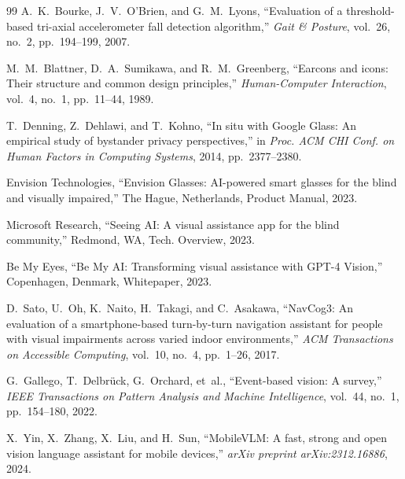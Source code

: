 \documentclass[10pt,twocolumn]{article}
\begin{document}
\begin{thebibliography}{99}
A.~K.~Bourke, J.~V.~O'Brien, and G.~M.~Lyons, ``Evaluation of a threshold-based tri-axial accelerometer fall detection algorithm,'' \emph{Gait \& Posture}, vol.~26, no.~2, pp.~194--199, 2007.

M.~M.~Blattner, D.~A.~Sumikawa, and R.~M.~Greenberg, ``Earcons and icons: Their structure and common design principles,'' \emph{Human-Computer Interaction}, vol.~4, no.~1, pp.~11--44, 1989.

T.~Denning, Z.~Dehlawi, and T.~Kohno, ``In situ with Google Glass: An empirical study of bystander privacy perspectives,'' in \emph{Proc. ACM CHI Conf. on Human Factors in Computing Systems}, 2014, pp.~2377--2380.

Envision Technologies, ``Envision Glasses: AI-powered smart glasses for the blind and visually impaired,'' The Hague, Netherlands, Product Manual, 2023.

Microsoft Research, ``Seeing AI: A visual assistance app for the blind community,'' Redmond, WA, Tech. Overview, 2023.

Be My Eyes, ``Be My AI: Transforming visual assistance with GPT-4 Vision,'' Copenhagen, Denmark, Whitepaper, 2023.

D.~Sato, U.~Oh, K.~Naito, H.~Takagi, and C.~Asakawa, ``NavCog3: An evaluation of a smartphone-based turn-by-turn navigation assistant for people with visual impairments across varied indoor environments,'' \emph{ACM Transactions on Accessible Computing}, vol.~10, no.~4, pp.~1--26, 2017.

G.~Gallego, T.~Delbrück, G.~Orchard, et~al., ``Event-based vision: A survey,'' \emph{IEEE Transactions on Pattern Analysis and Machine Intelligence}, vol.~44, no.~1, pp.~154--180, 2022.

X.~Yin, X.~Zhang, X.~Liu, and H.~Sun, ``MobileVLM: A fast, strong and open vision language assistant for mobile devices,'' \emph{arXiv preprint arXiv:2312.16886}, 2024.

\end{thebibliography}
\end{document}
